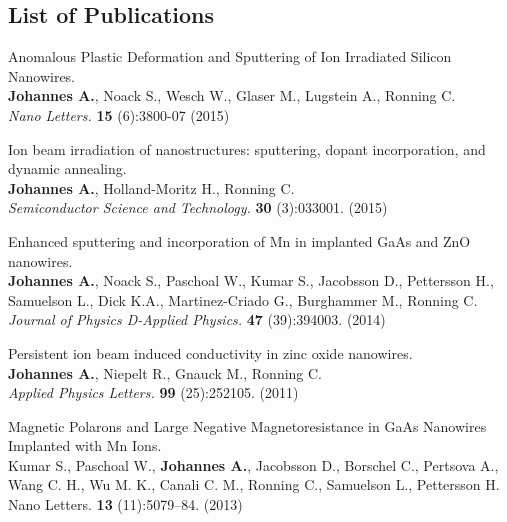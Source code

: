 
\newpage
\thispagestyle{empty}
\mbox{}

\begin{appendices}


\chapter{List of Publications}

\setlength{\parskip}{2em}
\setlength{\parindent}{0em}

Anomalous Plastic Deformation and Sputtering of Ion Irradiated Silicon Nanowires. \\
\textbf{Johannes A.}, Noack S., Wesch W., Glaser M., Lugstein A., Ronning C. \\
\emph{Nano Letters.} \textbf{15} (6):3800-07 (2015)


Ion beam irradiation of nanostructures: sputtering, dopant incorporation, and dynamic annealing.\\
\textbf{Johannes A.}, Holland-Moritz H., Ronning C.  \\
\emph{Semiconductor Science and Technology.} \textbf{30} (3):033001. (2015)


Enhanced sputtering and incorporation of Mn in implanted GaAs and ZnO nanowires.\\
\textbf{Johannes A.}, Noack S., Paschoal W., Kumar S., Jacobsson D., Pettersson H., Samuelson L., Dick K.A., Martinez-Criado G., Burghammer M., Ronning C.\\
\emph{Journal of Physics D-Applied Physics.} \textbf{47} (39):394003. (2014)


Persistent ion beam induced conductivity in zinc oxide nanowires. \\
\textbf{Johannes A.}, Niepelt R., Gnauck M., Ronning C.\\
\emph{Applied Physics Letters.} \textbf{99} (25):252105. (2011)

\newpage

Magnetic Polarons and Large Negative Magnetoresistance in GaAs Nanowires Implanted with Mn Ions. \\
Kumar S., Paschoal W., \textbf{Johannes A.}, Jacobsson D., Borschel C., Pertsova A., Wang C. H., Wu M. K., Canali C. M., Ronning C., Samuelson L., Pettersson H. \\ 
Nano Letters. \textbf{13} (11):5079–84. (2013)



\end{appendices}
